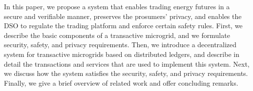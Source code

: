 In this paper, we propose a system that enables trading energy futures in a secure and verifiable manner, preserves the prosumers' privacy, and enables the DSO to regulate the trading platform and enforce certain safety rules.
First, we describe the basic components of a transactive microgrid, and we formulate security, safety, and privacy requirements. 
Then, we introduce a decentralized system for transactive microgrids based on distributed ledgers, and describe in detail the transactions and services that are used to implement this system.
Next, we discuss how the system satisfies the security, safety, and privacy requirements.
Finally, we give a brief overview of related work and offer concluding remarks.

